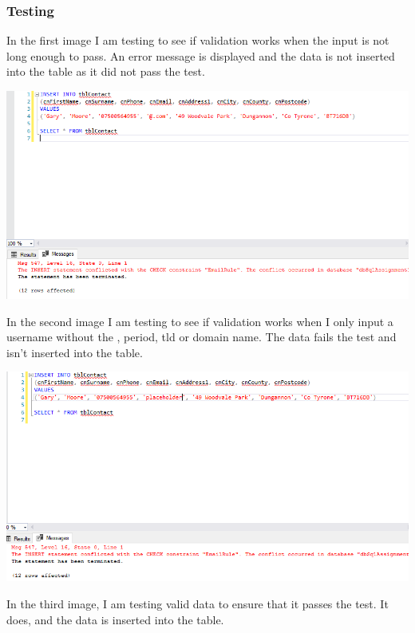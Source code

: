 \documentclass[11pt,a4paper]{scrartcl}
\begin{document}
	\subsubsection*{Testing}
	
	In the first image I am testing to see if validation works when the input is not long enough to pass. An error message is displayed and the data is not inserted into the table as it did not pass the test.
	
	\begin{center}
		\includegraphics[width=0.9\linewidth]{images/EmailConstraintTest1}
	\end{center}
	
	In the second image I am testing to see if validation works when I only input a username without the \texttt{\@}, period, tld or domain name. The data fails the test and isn't inserted into the table.
	
	\begin{center}
		\includegraphics[width=0.9\linewidth]{images/EmailConstraintTest2}
	\end{center}
	
	In the third image, I am testing valid data to ensure that it passes the test. It does, and the data is inserted into the table.
	
\end{document}
